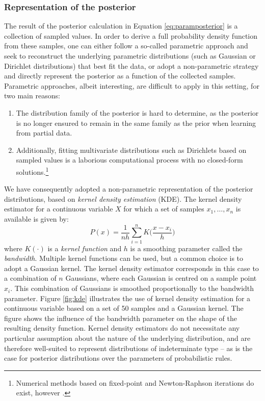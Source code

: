 \subsubsection*{Representation of the posterior}

The result of the posterior calculation in Equation \eqref{eq:paramposterior} is a collection of sampled values. In order to derive a full probability density function from these samples, one can either follow a so-called parametric approach and seek to reconstruct the underlying parametric distributions (such as Gaussian or Dirichlet distributions) that best fit the data, or adopt a non-parametric strategy and directly represent the posterior as a function of the collected samples. Parametric approaches, albeit interesting, are difficult to apply in this setting, for two main reasons:
\begin{enumerate}
\item The distribution family of the posterior is hard to determine, as the posterior is no longer ensured to remain in the same family as the prior when learning from partial data.  
\item Additionally, fitting multivariate distributions such as Dirichlets based on sampled values is a laborious computational process with no closed-form solutions.\footnote{Numerical methods based on fixed-point and Newton-Raphson iterations do exist, however \citep{minka2003}.}
\end{enumerate}

We have consequently adopted a non-parametric representation of the posterior distributions, based on \textit{kernel density estimation} (KDE).  The kernel density estimator for a continuous variable $X$ for which a set of samples $x_1, \dots, x_n$ is available is given by:
\begin{equation}
P(x) = \frac{1}{nh} \sum_{i=1}^n K\Big(\frac{x-x_i}{h}\Big) \label{eq:kde}
\end{equation}
where $K(\cdot)$ is a \textit{kernel function} and $h$ is a smoothing parameter called the \textit{bandwidth}. Multiple kernel functions can be used, but a common choice is to adopt a Gaussian kernel. The kernel density estimator corresponds in this case to a combination of $n$ Gaussians, where each Gaussian is centred on a sample point $x_i$.  This combination of Gaussians is smoothed proportionally to the bandwidth parameter. Figure \ref{fig:kde} illustrates the use of kernel density estimation for a continuous variable based on a set of 50 samples and a Gaussian kernel. The figure shows the influence of the bandwidth parameter on the shape of the resulting density function. Kernel density estimators do not necessitate any particular assumption about the nature of the underlying distribution, and are therefore well-suited to represent distributions of indeterminate type -- as is the case for posterior distributions over the parameters of probabilistic rules. 

